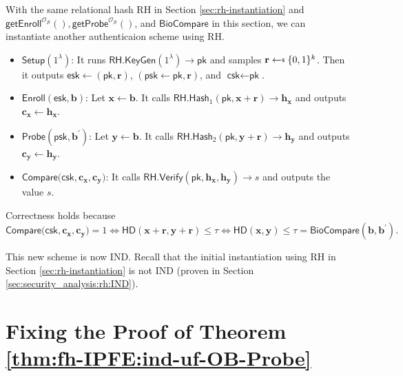 With the same relational hash \textsf{RH} in Section \ref{sec:rh-instantiation} and $\textsf{getEnroll}^{\mathcal{O}_{\mathcal{B}}}(), \textsf{getProbe}^{\mathcal{O}_{\mathcal{B}}}()$, and $ \textsf{BioCompare}$ in this section, we can instantiate another authenticaion scheme using \textsf{RH}.

\begin{itemize}

	\item $\textsf{Setup}(1^\lambda)$: It runs $\textsf{RH.KeyGen}(1^\lambda) \to \textsf{pk}$ and samples $\mathbf{r} \getsdollar \{0, 1\}^k$. Then it outputs $\textsf{esk} \gets (\textsf{pk}, \mathbf{r})$, $(\textsf{psk} \gets \textsf{pk}, \mathbf{r})$, and $\textsf{csk} \gets \textsf{pk}$.

	\item $\textsf{Enroll}(\textsf{esk}, \mathbf{b})$: Let $\mathbf{x} \gets \mathbf{b}$. It calls $\textsf{RH.Hash}_1(\textsf{pk}, \mathbf{x} + \mathbf{r}) \to \mathbf{h_x}$ and outputs $\mathbf{c_x} \gets \mathbf{h_x}$.

	\item $\textsf{Probe}(\textsf{psk}, \mathbf{b}^\prime)$: Let $\mathbf{y} \gets \mathbf{b}$. It calls $\textsf{RH.Hash}_2(\textsf{pk}, \mathbf{y} + \mathbf{r}) \to \mathbf{h_y}$ and outputs $\mathbf{c_y} \gets \mathbf{h_y}$.

	\item $\textsf{Compare}(\textsf{csk}, \mathbf{c_x}, \mathbf{c_y)}$: It calls $\textsf{RH.Verify}(\textsf{pk}, \mathbf{h_x}, \mathbf{h_y}) \to s$ and outputs the value $s$.

\end{itemize}
Correctness holds because
\[
	\textsf{Compare}(\textsf{csk}, \mathbf{c_x}, \mathbf{c_y)} = 1 \Leftrightarrow \textsf{HD}(\mathbf{x} + \mathbf{r}, \mathbf{y} + \mathbf{r}) \leq \tau \Leftrightarrow \textsf{HD}(\mathbf{x}, \mathbf{y}) \leq \tau = \textsf{BioCompare}(\mathbf{b}, \mathbf{b}^\prime).
\]

This new scheme is now IND. Recall that the initial instantiation using \textsf{RH} in Section \ref{sec:rh-instantiation} is not IND (proven in Section \ref{sec:security_analysis:rh:IND}).

\iffalse

\section{Fixing the Proof of Theorem \ref{thm:fh-IPFE:ind-uf-OB-Probe}}

